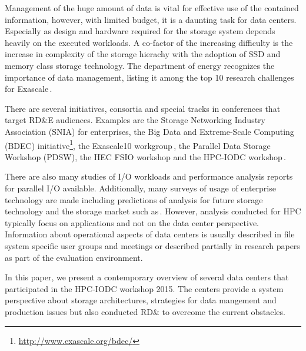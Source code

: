 \documentclass{superfri}
\numberwithin{equation}{section}
\begin{document}
Management of the huge amount of data is vital for effective use of the contained information, however, with limited budget, it is a daunting task for data centers.
Especially as design and hardware required for the storage system depends heavily on the executed workloads.
A co-factor of the increasing difficulty is the increase in complexity of the storage hierachy with the adoption of SSD and memory class storage technology.
The department of energy recognizes the importance of data management, listing it among the top 10 research challenges for Exascale\,\cite{top14}. %

There are several initiatives, consortia and special tracks in conferences that target RD\&E audiences.
Examples are the Storage Networking Industry Association (SNIA) for enterprises, the 
Big Data and Extreme-Scale Computing (BDEC) initiative\footnote{\url{http://www.exascale.org/bdec/}}, the 
Exascale10 workgroup\,\cite{brinkmann14}, the Parallel Data Storage Workshop (PDSW), the HEC FSIO workshop \cite{bancroft2009} and the HPC-IODC workshop\,\cite{iodc}.

There are also many studies of I/O workloads and performance analysis reports for parallel I/O available.
Additionally, many surveys of usage of enterprise technology are made including predictions of analysis for future storage technology and the storage market such as\,\cite{idc1}.
However, analysis conducted for HPC typically focus on applications and not on the data center perspective.
Information about operational aspects of data centers is usually described in file system specific user groups and meetings or described partially in research papers as part of the evaluation environment.


In this paper, we present a contemporary overview of several data centers that participated in the HPC-IODC workshop 2015.
The centers provide a system perspective about storage architectures, strategies for data mangement and production issues but also conducted RD\& to overcome the current obstacles.
\end{document}
